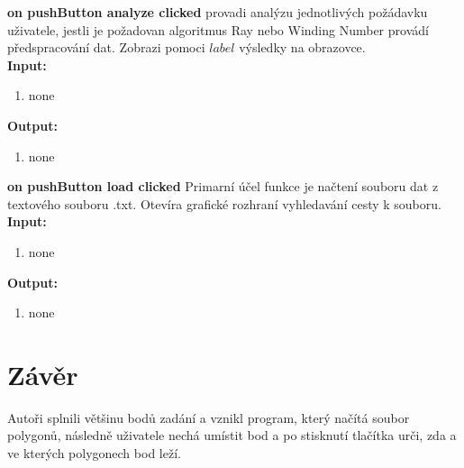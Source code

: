\documentclass{article}
\begin{document}
\bigskip 


\textbf{on pushButton analyze clicked} provadi analýzu jednotlivých požádavku uživatele, jestli je požadovan algoritmus Ray nebo Winding Number provádí předspracování dat. Zobrazi pomoci $label$ výsledky na obrazovce.\\ 

\bigskip 
 \textbf{Input:}
\begin{enumerate} 
\item none
\end{enumerate}
\bigskip
 \textbf{Output:}
\begin{enumerate} 
\item none
\end{enumerate}

\bigskip 

\textbf{on pushButton load clicked} Primarní účel funkce je načtení souboru dat z textového souboru .txt. Otevíra grafické rozhraní vyhledavání cesty k souboru.\\ 

\bigskip 
 \textbf{Input:}
\begin{enumerate} 
\item none
\end{enumerate}
\bigskip
 \textbf{Output:}
\begin{enumerate} 
\item none
\end{enumerate} 

\newpage 

 

\section{Závěr}
\indent Autoři splnili většinu bodů zadání a vznikl program, který načítá soubor polygonů, následně uživatele nechá umístit bod a po stisknutí tlačítka urči, zda a ve kterých polygonech bod leží. 
\end{document}
